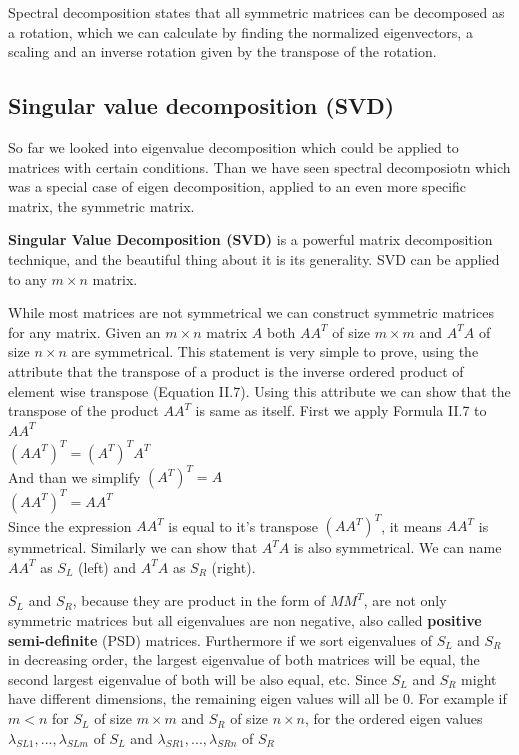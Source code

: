 Spectral decomposition states that all symmetric matrices can be decomposed as a rotation, which we can calculate by finding the normalized eigenvectors, a scaling and an inverse rotation given by the transpose of the rotation.

\subsection{Singular value decomposition (SVD)}

So far we looked into eigenvalue decomposition which could be applied to matrices with certain conditions. Than we have seen spectral decomposiotn which was a special case of eigen decomposition, applied to an even more specific matrix, the symmetric matrix.

\textbf{Singular Value Decomposition (SVD)} is a powerful matrix decomposition technique, and the beautiful thing about it is its generality. SVD can be applied to any \(m \times n\) matrix.

While most matrices  are not symmetrical we can construct symmetric matrices for any matrix. Given an \(m \times n\) matrix \(A\) both \(AA^T\) of size \(m\times m\) and \(A^TA\) of size \(n \times n\) are symmetrical. This statement is very simple to prove, using the attribute that the transpose of a product is the inverse ordered product of element wise transpose (Equation II.7). Using this attribute we can show that the transpose of the product \(AA^T\) is same as itself. First we apply Formula II.7 to \(AA^T\)\\

\((AA^T)^T = (A^T)^TA^T\)\\
And than we simplify \((A^T)^T = A\)\\
\((AA^T)^T = AA^T\)\\

Since the expression \(AA^T\) is equal to it's transpose \((AA^T)^T\), it means \(AA^T\) is symmetrical. Similarly we can show that \(A^TA\) is also symmetrical. We can name \(AA^T\) as \(S_L\) (left) and \(A^TA\) as \(S_R\) (right).

\(S_L\) and \(S_R\), because they are product in the form of \(MM^T\), are not only symmetric matrices but all eigenvalues are non negative, also called \textbf{positive semi-definite} (PSD) matrices. Furthermore if we sort eigenvalues of \(S_L\) and \(S_R\) in decreasing order, the largest eigenvalue of both matrices will be equal, the second largest eigenvalue of both will be also equal, etc. Since \(S_L\) and \(S_R\) might have different dimensions, the remaining eigen values will all be \(0\). For example if \(m < n\) for \(S_L\) of size \(m \times m\) and \(S_R\) of size \(n \times n\), for the ordered eigen values \(\lambda_{SL1},...,\lambda_{SLm}\) of \(S_L\) and \(\lambda_{SR1},...,\lambda_{SRn}\) of \(S_R\)

